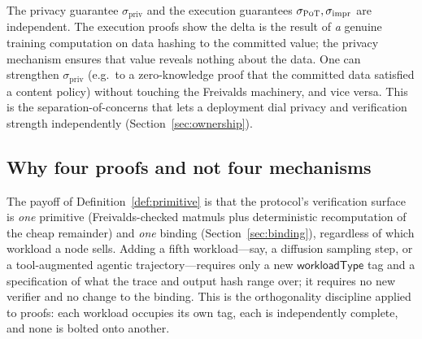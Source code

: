 \begin{remark}
The privacy guarantee $\sigma_{\mathrm{priv}}$ and the execution guarantees
$\sigma_{\textsc{PoT}{}}, \sigma_{\mathrm{impr}}$ are independent. The execution proofs show
the delta is the result of \emph{a} genuine training computation on data hashing to
the committed value; the privacy mechanism ensures that value reveals nothing about
the data. One can strengthen $\sigma_{\mathrm{priv}}$ (e.g.\ to a zero-knowledge
proof that the committed data satisfied a content policy) without touching the
Freivalds machinery, and vice versa. This is the separation-of-concerns that lets a
deployment dial privacy and verification strength independently
(Section~\ref{sec:ownership}).
\end{remark}

\subsection{Why four proofs and not four mechanisms}

The payoff of Definition~\ref{def:primitive} is that the protocol's verification
surface is \emph{one} primitive (Freivalds-checked matmuls plus deterministic
recomputation of the cheap remainder) and \emph{one} binding
(Section~\ref{sec:binding}), regardless of which workload a node sells. Adding a
fifth workload---say, a diffusion sampling step, or a tool-augmented agentic
trajectory---requires only a new $\mathsf{workloadType}$ tag and a specification of
what the trace and output hash range over; it requires no new verifier and no change
to the binding. This is the orthogonality discipline applied to proofs: each
workload occupies its own tag, each is independently complete, and none is bolted
onto another.
